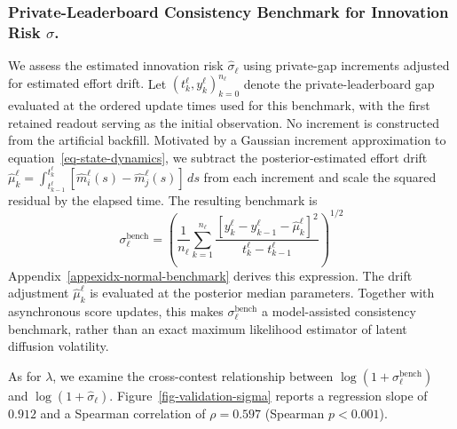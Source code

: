 \documentclass[mnsc]{informs3}
\begin{document}
\subsubsection{Private-Leaderboard Consistency Benchmark for Innovation Risk $\sigma$.}
{We assess the estimated innovation risk $\hat\sigma_\ell$ using private-gap increments adjusted for estimated effort drift.}
Let $(t^\ell_k,y^\ell_k)_{k=0}^{n_\ell}$ denote the private-leaderboard gap evaluated at the ordered update times used for this benchmark, {with the first retained readout serving as the initial observation. No increment is constructed from the artificial backfill.}
Motivated by a Gaussian increment approximation to equation~\eqref{eq-state-dynamics}, we subtract the posterior-estimated effort drift $\hat\mu_k^\ell=\int_{t^\ell_{k-1}}^{t^\ell_k}[\hat m_i^\ell(s)-\hat m_j^\ell(s)]\,ds$ from each increment and scale the squared residual by the elapsed time. {The resulting benchmark is}
\begin{equation*}
\sigma^{\text{bench}}_\ell = \left(\frac{1}{n_\ell}\sum_{k=1}^{n_\ell}\frac{\left[y^\ell_k-y^\ell_{k-1}-\hat\mu^\ell_k\right]^2}{t^\ell_k-t^\ell_{k-1}}\right)^{1/2}
\end{equation*}
{Appendix~\ref{appexidx-normal-benchmark} derives this expression. The drift adjustment $\hat\mu_k^\ell$ is evaluated at the posterior median parameters. Together with asynchronous score updates, this makes $\sigma_\ell^{\mathrm{bench}}$ a model-assisted consistency benchmark, rather than an exact maximum likelihood estimator of latent diffusion volatility.}

{As for $\lambda$, we examine the cross-contest relationship between $\log(1+\sigma_\ell^{\mathrm{bench}})$ and $\log(1+\hat\sigma_\ell)$.}
Figure~\ref{fig-validation-sigma} reports a regression slope of $0.912$ and a Spearman correlation of $\rho=0.597$ (Spearman $p<0.001$).
\end{document}
